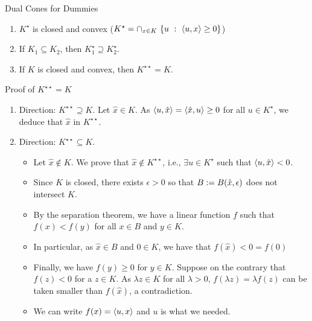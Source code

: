 \documentclass[9pt]{beamer}
\begin{document}
\begin{frame}{Dual Cones for Dummies}

  \begin{enumerate}
    \setlength\itemsep{1em}
  \item  $K^\star$ is closed and convex ($K^\star = \cap_{x\in K} \, \left\{ u\ : \ \left<u, x\right>\geq 0 \right\}$)

  \item<2->  If $K_1 \subseteq K_2$, then $K_1^\star \supseteq K_2^\star$.

  \item<3-> If $K$ is closed and convex, then $K^{\star\star} =K$.
\end{enumerate}

\end{frame}

\begin{frame}{Proof of $K^{\star\star}=K$}

  \begin{enumerate}
    \setlength\itemsep{1em}
  \item Direction: {$K^{\star \star} \supseteq K$.} Let $\hat x \in K$. As $\left<u, \hat x\right> = \left<\hat x, u\right> \geq 0$ for all $u\in K^\star$, we deduce that $\hat x$ in $K^{\star \star}$.

  \item<2-> Direction: $K^{\star \star} \subseteq K$.
    \begin{itemize}
      \setlength\itemsep{0.5em}
    \item<2-> Let $\hat x\notin K$. We prove that $\hat x \notin K^{\star \star}$, i.e., $\exists u \in K^\star$ such that $\left<u, \hat x\right> < 0$.
    \item<3-> Since $K$ is closed, there exists $\epsilon > 0$ so that $B := B(\hat x, \epsilon)$ does not intersect $K$.
    \item<4-> By the separation theorem, we have a linear function $f$ such that $f(x) < f(y)$ for all $x\in B$ and $y \in K$.
    \item<5-> In particular, as $\hat x\in B$ and $0\in K$, we have that $f(\hat x) < 0=f(0)$
    \item<6-> Finally, we have $f(y) \geq 0$ for $y\in K$. Suppose on the contrary that $f(z) < 0$ for a $z\in K$. As $\lambda z\in K$ for all $\lambda >0$, $ f(\lambda z) = \lambda f(z)$ can be taken smaller than $f(\hat x)$, a contradiction.
    \item<7-> We can write $f(x) = \left<u, x\right>$ and $u$ is what we needed.
    \end{itemize}
         
  \end{enumerate}

\end{frame}
\end{document}
